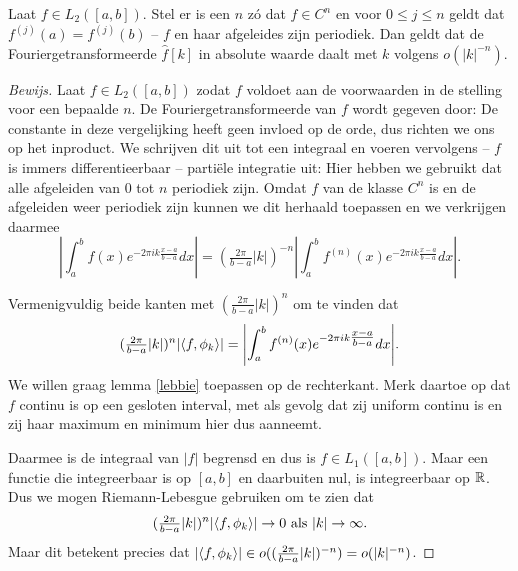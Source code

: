 \begin{stelling}
\label{fourier_daling}
  Laat $f \in L_2([a,b])$. Stel er is een $n$ z\'o dat $f \in C^n$ en voor $0\leq j\leq n$ geldt dat $f^{(j)}(a) = f^{(j)}(b)$ -- $f$ en haar afgeleides zijn periodiek. Dan geldt dat de Fouriergetransformeerde $\hat f[k]$ in absolute waarde
  daalt met $k$ volgens $o(|k|^{-n})$.
\end{stelling}
\begin{proof}[Bewijs]
  Laat $f \in L_2([a,b])$ zodat $f$ voldoet aan de voorwaarden in de stelling voor een bepaalde $n$. 
  De Fouriergetransformeerde van $f$ wordt gegeven door:
  De constante in deze vergelijking heeft geen invloed op de orde, dus richten we ons op het inproduct. 
  We schrijven dit uit tot een integraal en voeren vervolgens -- $f$ is immers differentieerbaar -- parti\"ele
  integratie uit:
  Hier hebben we gebruikt dat alle afgeleiden van $0$ tot $n$ periodiek zijn.
  Omdat $f$ van de klasse $C^n$ is en de afgeleiden weer periodiek zijn kunnen we dit herhaald toepassen en we verkrijgen daarmee
  \[
  \left| \int_a^b f(x) e^{-2 \pi i k \tfrac{x-a}{b-a}} dx \right| 
  = (\tfrac{2 \pi}{b-a} |k|)^{-n}\left| \int_a^b f^{(n)}(x) e^{- 2 \pi i k \tfrac{x-a}{b-a}} dx \right|.
  \]
  
  Vermenigvuldig beide kanten met $(\tfrac{2 \pi}{b-a} |k|)^n$ om te vinden dat
  \[
  (\tfrac{2 \pi}{b-a} |k|)^n {\left| \langle f , \phi_k \rangle \right|} 
  = {\left| \int_a^b f^{(n)}(x) e^{- 2 \pi i k \tfrac{x-a}{b-a}} dx \right|}.
  \]
  We willen graag lemma \ref{lebbie} toepassen op de rechterkant. 
  Merk daartoe op dat $f$ continu is op een gesloten interval, met als gevolg dat zij uniform continu is 
  en zij haar maximum en minimum hier dus aanneemt.

  Daarmee is de integraal van $|f|$ begrensd en dus is $f\in L_1([a,b])$. 
  Maar een functie die integreerbaar is op $[a,b]$ en daarbuiten nul, is integreerbaar op $\mathbb{R}$. 
  Dus we mogen Riemann-Lebesgue gebruiken om te zien dat
  \[
  (\tfrac{2 \pi}{b-a} |k|)^n {\left| \langle f , \phi_k \rangle \right|} \to 0 \text{ als } |k| \to \infty.
  \]
  Maar dit betekent precies dat ${\left| \langle f , \phi_k \rangle \right|} \in  o((\tfrac{2 \pi}{b-a} |k|)^{-n}) = o(|k|^{-n})$.
\end{proof}

